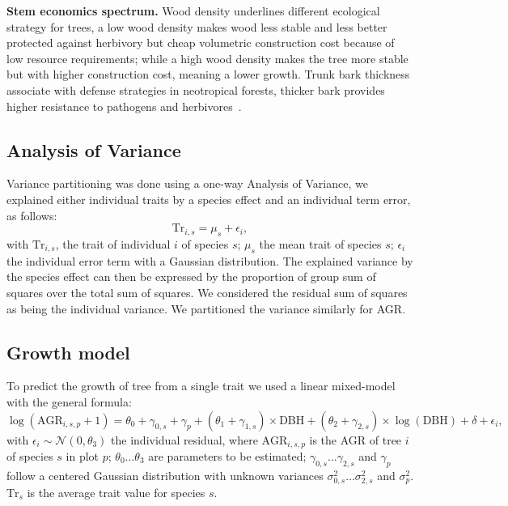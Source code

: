 \textbf{Stem economics spectrum.} Wood density underlines different ecological strategy for trees, a low wood density makes wood less stable and less better protected against herbivory but cheap volumetric construction cost because of low resource requirements; while a high wood density makes the tree more stable but with higher construction cost, meaning a lower growth. Trunk bark thickness associate with defense strategies in neotropical forests, thicker bark provides higher resistance to pathogens and herbivores~\citep{paine_functional_2010}.

\subsection*{Analysis of Variance}
Variance partitioning was done using a one-way Analysis of Variance, we explained either individual traits by a species effect and an individual term error, as follows:
\begin{equation}
	\label{eq:anova}
	\text{Tr}_{i,s} = \mu_s + \epsilon_i,
\end{equation}
with $\text{Tr}_{i,s}$, the trait of individual $i$ of species $s$; $\mu_s$ the mean trait of species $s$; $\epsilon_i$ the individual error term with a Gaussian distribution. The explained variance by the species effect can then be expressed by the proportion of group sum of squares over the total sum of squares. We considered the residual sum of squares as being the individual variance. We partitioned the variance similarly for AGR.

\subsection*{Growth model}

To predict the growth of tree from a single trait we used a linear mixed-model with the general formula:
\begin{equation}
	\label{eq:growth_mod}
	\log(\text{AGR}_{i, s, p} + 1) = \theta_0 + \gamma_{0, s} + \gamma_p
		+ (\theta_1 + \gamma_{1, s}) \times \text{DBH}
		+ (\theta_2 + \gamma_{2, s}) \times \log(\text{DBH})
		+ \delta
		+ \epsilon_i,
\end{equation}
with $\epsilon_i \sim \mathcal{N}(0, \theta_3)$ the individual residual,
where $\text{AGR}_{i, s, p}$ is the AGR of tree $i$ of species $s$ in plot $p$; $\theta_0 \ldots \theta_3$ are parameters to be estimated; $\gamma_{0, s} \ldots \gamma_{2, s}$ and $\gamma_p$ follow a centered Gaussian distribution with unknown variances $\sigma^2_{0, s} \ldots \sigma^2_{2, s}$ and $\sigma^2_p$. $\text{Tr}_s$ is the average trait value for species $s$.

